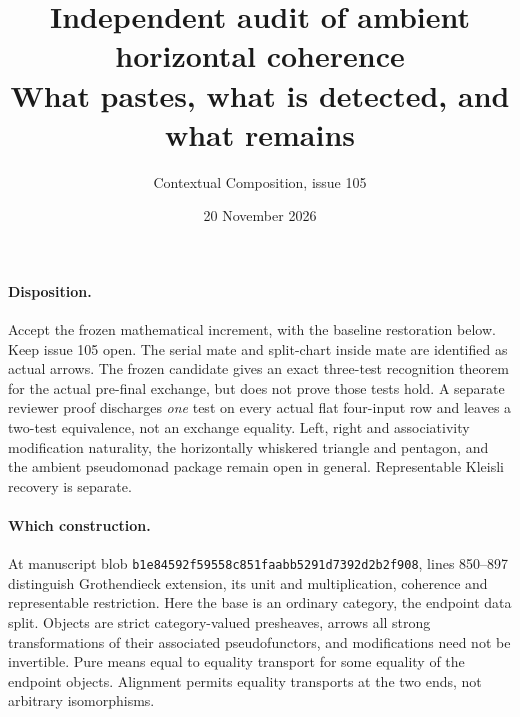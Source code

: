 \documentclass[10pt]{article}
\title{Independent audit of ambient horizontal coherence\\\large What pastes, what is detected, and what remains}
\author{Contextual Composition, issue 105}\date{20 November 2026}
\newcommand{\code}{\nolinkurl}\setlength{\emergencystretch}{3em}
\begin{document}
\maketitle
\paragraph{Disposition.} Accept the frozen mathematical increment, with the baseline restoration below. Keep issue 105 open. The serial mate and split-chart inside mate are identified as actual arrows. The frozen candidate gives an exact three-test recognition theorem for the actual pre-final exchange, but does not prove those tests hold. A separate reviewer proof discharges \emph{one} test on every actual flat four-input row and leaves a two-test equivalence, not an exchange equality. Left, right and associativity modification naturality, the horizontally whiskered triangle and pentagon, and the ambient pseudomonad package remain open in general. Representable Kleisli recovery is separate.
\paragraph{Which construction.} At manuscript blob \code{b1e84592f59558c851faabb5291d7392d2b2f908}, lines 850--897 distinguish Grothendieck extension, its unit and multiplication, coherence and representable restriction. Here the base is an ordinary category, the endpoint data split. Objects are strict category-valued presheaves, arrows all strong transformations of their associated pseudofunctors, and modifications need not be invertible. Pure means equal to equality transport for some equality of the endpoint objects. Alignment permits equality transports at the two ends, not arbitrary isomorphisms.
\end{document}
